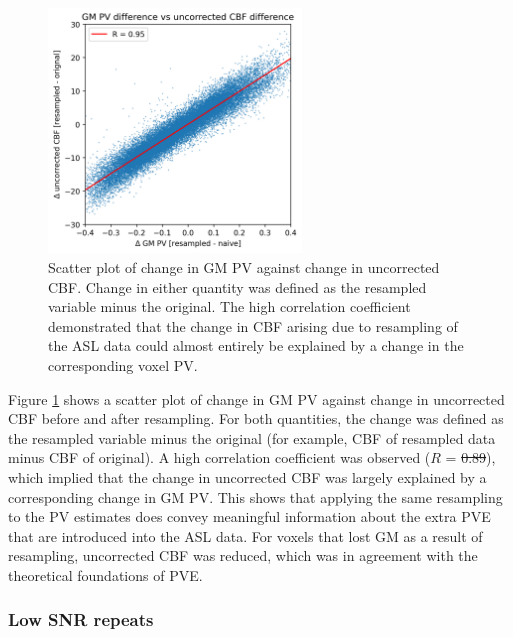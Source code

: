 \documentclass[12pt]{report}
\providecommand{\DIFaddtex}[1]{{\protect\color{blue}\uwave{#1}}} %
\providecommand{\DIFdeltex}[1]{{\protect\color{red}\sout{#1}}}                      %
\providecommand{\DIFaddbegin}{} %
\providecommand{\DIFaddend}{} %
\providecommand{\DIFdelbegin}{} %
\providecommand{\DIFdelend}{} %
\providecommand{\DIFadd}[1]{\texorpdfstring{\DIFaddtex{#1}}{#1}} %
\providecommand{\DIFdel}[1]{\texorpdfstring{\DIFdeltex{#1}}{}} %
\newcommand{\DIFscaledelfig}{0.5}
\newlength{\DIFdelgraphicswidth} %
\newlength{\DIFdelgraphicsheight} %
\newcommand{\DIFaddincludegraphics}[2][]{{\color{blue}\fbox{\DIFOincludegraphics[#1]{#2}}}} %
\newcommand{\DIFdelincludegraphics}[2][]{%
\sbox{\DIFdelgraphicsbox}{\DIFOincludegraphics[#1]{#2}}%
\settoboxwidth{\DIFdelgraphicswidth}{\DIFdelgraphicsbox} %
\settoboxtotalheight{\DIFdelgraphicsheight}{\DIFdelgraphicsbox} %
\scalebox{\DIFscaledelfig}{%
\parbox[b]{\DIFdelgraphicswidth}{\usebox{\DIFdelgraphicsbox}\\[-\baselineskip] \rule{\DIFdelgraphicswidth}{0em}}\llap{\resizebox{\DIFdelgraphicswidth}{\DIFdelgraphicsheight}{%
\setlength{\unitlength}{\DIFdelgraphicswidth}%
\begin{picture}(1,1)%
\thicklines\linethickness{2pt} %
{\color[rgb]{1,0,0}\put(0,0){\framebox(1,1){}}}%
{\color[rgb]{1,0,0}\put(0,0){\line( 1,1){1}}}%
{\color[rgb]{1,0,0}\put(0,1){\line(1,-1){1}}}%
\end{picture}%
}\hspace*{3pt}}} %
} %
\DeclareRobustCommand{\DIFaddbegin}{\DIFOaddbegin \let\includegraphics\DIFaddincludegraphics} %
\DeclareRobustCommand{\DIFaddend}{\DIFOaddend \let\includegraphics\DIFOincludegraphics} %
\DeclareRobustCommand{\DIFdelbegin}{\DIFOdelbegin \let\includegraphics\DIFdelincludegraphics} %
\DeclareRobustCommand{\DIFdelend}{\DIFOaddend \let\includegraphics\DIFOincludegraphics} %
\begin{document}
\begin{figure}[H]
\centering
\includegraphics[width = 0.6\textwidth]{sim_asl_deltapv_deltacbf.png}
\caption{Scatter plot of change in GM PV against change in uncorrected CBF. Change in either quantity was defined as the resampled variable minus the original. The high correlation coefficient demonstrated that the change in CBF arising due to resampling of the ASL data could almost entirely be explained by a change in the corresponding voxel PV.}
\label{sim_asl_deltapv_deltacbf}
\end{figure}

Figure \ref{sim_asl_deltapv_deltacbf} shows a scatter plot of change in GM PV against change in uncorrected CBF before and after resampling. For both quantities, the change was defined as the resampled variable minus the original (for example, CBF of resampled data minus CBF of original). A high correlation coefficient was observed ($R$ = \DIFdelbegin \DIFdel{0.89}\DIFdelend \DIFaddbegin \DIFadd{0.95}\DIFaddend ), which implied that the change in uncorrected CBF was largely explained by a corresponding change in GM PV. This shows that applying the same resampling to the PV estimates does convey meaningful information about the extra PVE that are introduced into the ASL data. For voxels that lost GM as a result of resampling, uncorrected CBF was reduced, which was in agreement with the theoretical foundations of PVE. 

\subsubsection{Low SNR repeats}
\end{document}
